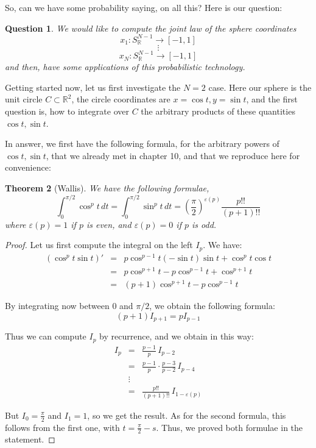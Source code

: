 \documentclass[12pt]{amsbook}
\newtheorem{theorem}{Theorem}[chapter]
\newtheorem{question}[theorem]{Question}
\begin{document}
\bigskip 

So, can we have some probability saying, on all this? Here is our question:


\begin{question}
We would like to compute the joint law of the sphere coordinates
$$x_1:S^{N-1}_\mathbb R\to[-1,1]$$
$$\vdots$$
$$x_N:S^{N-1}_\mathbb R\to[-1,1]$$
and then, have some applications of this probabilistic technology.
\end{question}

Getting started now, let us first investigate the $N=2$ case. Here our sphere is the unit circle $C\subset\mathbb R^2$, the circle coordinates are $x=\cos t,y=\sin t$, and the first question is, how to integrate over $C$ the arbitrary products of these quantities $\cos t,\sin t$. 

\bigskip

In answer, we first have the following formula, for the arbitrary powers of $\cos t,\sin t$, that we already met in chapter 10, and that we reproduce here for convenience:


\begin{theorem}[Wallis]
We have the following formulae,
$$\int_0^{\pi/2}\cos^pt\,dt=\int_0^{\pi/2}\sin^pt\,dt=\left(\frac{\pi}{2}\right)^{\varepsilon(p)}\frac{p!!}{(p+1)!!}$$
where $\varepsilon(p)=1$ if $p$ is even, and $\varepsilon(p)=0$ if $p$ is odd.
\end{theorem}

\begin{proof}
Let us first compute the integral on the left $I_p$. We have:
\begin{eqnarray*}
(\cos^pt\sin t)'
&=&p\cos^{p-1}t(-\sin t)\sin t+\cos^pt\cos t\\
&=&p\cos^{p+1}t-p\cos^{p-1}t+\cos^{p+1}t\\
&=&(p+1)\cos^{p+1}t-p\cos^{p-1}t
\end{eqnarray*}

By integrating now between $0$ and $\pi/2$, we obtain the following formula:
$$(p+1)I_{p+1}=pI_{p-1}$$

Thus we can compute $I_p$ by recurrence, and we obtain in this way:
\begin{eqnarray*}
I_p
&=&\frac{p-1}{p}\,I_{p-2}\\
&=&\frac{p-1}{p}\cdot\frac{p-3}{p-2}\,I_{p-4}\\
&\vdots&\\
&=&\frac{p!!}{(p+1)!!}\,I_{1-\varepsilon(p)}
\end{eqnarray*}

But $I_0=\frac{\pi}{2}$ and $I_1=1$, so we get the result. As for the second formula, this follows from the first one, with $t=\frac{\pi}{2}-s$. Thus, we proved both formulae in the statement.
\end{proof}
\end{document}
